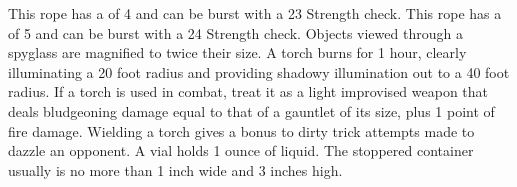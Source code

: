          This rope has a  of 4 and can be burst with a  23 Strength check.
         This rope has a  of 5 and can be burst with a  24 Strength check.
         Objects viewed through a spyglass are magnified to twice their size.
         A torch burns for 1 hour, clearly illuminating a 20 foot radius and providing shadowy illumination out to a 40 foot radius. If a torch is used in combat, treat it as a light improvised weapon that deals bludgeoning damage equal to that of a gauntlet of its size, plus 1 point of fire damage. Wielding a torch gives a  bonus to dirty trick attempts made to dazzle an opponent.
         A vial holds 1 ounce of liquid. The stoppered container usually is no more than 1 inch wide and 3 inches high.

